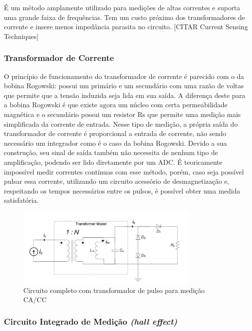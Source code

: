 É um método amplamente utilizado para medições de altas correntes e suporta uma grande faixa de frequências. Tem um custo próximo dos transformadores de corrente e insere menos impedância parasita no circuito. [CITAR Current Sensing Techniques]

\subsubsection{Transformador de Corrente}\label{subsubsec:t-corrente}

O princípio de funcionamento do transformador de corrente é parecido com o da bobina Rogowski: possui um primário e um secundário com uma razão de voltas que permite que a tensão induzida seja lida em sua saída. A diferença deste para a bobina Rogowski é que existe agora um núcleo com certa permeabilidade magnética e o secundário possui um resistor Rs que permite uma medição mais simplificada da corrente de entrada.
Nesse tipo de medição, a própria saída do transformador de corrente é proporcional a entrada de corrente, não sendo necessário um integrador como é o caso da bobina Rogowski. Devido a sua construção, seu sinal de saída também não necessita de nenhum tipo de amplificação, podendo ser lido diretamente por um ADC. É teoricamente impossível medir correntes contínuas com esse método, porém, caso seja possível pulsar essa corrente, utilizando um circuito acessório de desmagnetização e, respeitando os tempos necessários entre os pulsos, é possível obter uma medida satisfatória.

\begin{figure}[htb]
    \caption{Circuito completo com transformador de pulso para medição CA/CC}
    \label{fig:circuito-tc-dc}
    \includegraphics[width=0.8\textwidth]{figuras/transform-corrente-dc.png}
\end{figure}

\subsubsection{Circuito Integrado de Medição \textit{(hall effect)}}\label{subsubsec:halleffect}

